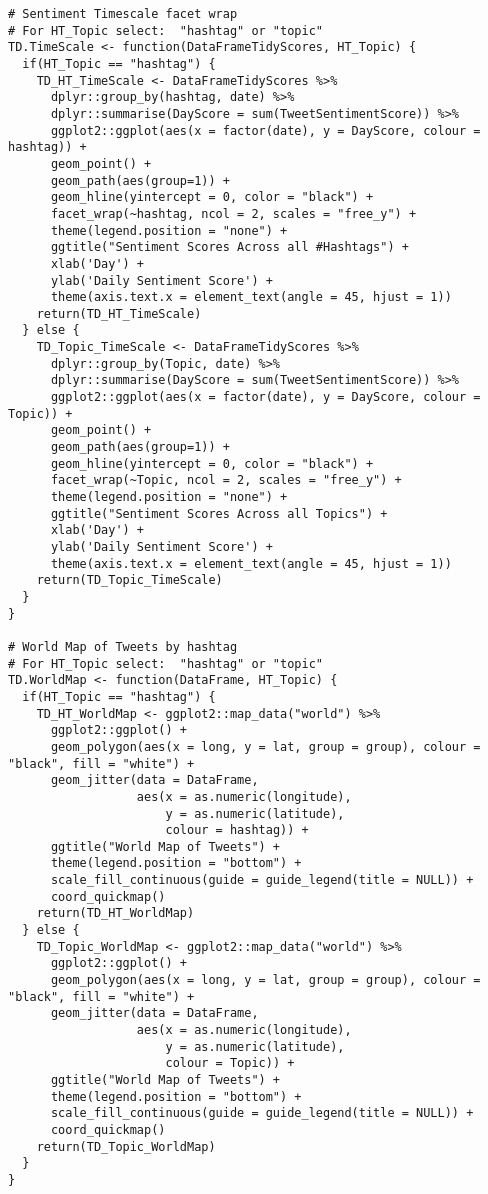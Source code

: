 \begin{lstlisting}
# Sentiment Timescale facet wrap
# For HT_Topic select:  "hashtag" or "topic"
TD.TimeScale <- function(DataFrameTidyScores, HT_Topic) {
  if(HT_Topic == "hashtag") {
    TD_HT_TimeScale <- DataFrameTidyScores %>% 
      dplyr::group_by(hashtag, date) %>% 
      dplyr::summarise(DayScore = sum(TweetSentimentScore)) %>% 
      ggplot2::ggplot(aes(x = factor(date), y = DayScore, colour = hashtag)) + 
      geom_point() +
      geom_path(aes(group=1)) +
      geom_hline(yintercept = 0, color = "black") +
      facet_wrap(~hashtag, ncol = 2, scales = "free_y") +
      theme(legend.position = "none") +
      ggtitle("Sentiment Scores Across all #Hashtags") +
      xlab('Day') +
      ylab('Daily Sentiment Score') +
      theme(axis.text.x = element_text(angle = 45, hjust = 1))
    return(TD_HT_TimeScale)
  } else {
    TD_Topic_TimeScale <- DataFrameTidyScores %>% 
      dplyr::group_by(Topic, date) %>% 
      dplyr::summarise(DayScore = sum(TweetSentimentScore)) %>% 
      ggplot2::ggplot(aes(x = factor(date), y = DayScore, colour = Topic)) + 
      geom_point() +
      geom_path(aes(group=1)) +
      geom_hline(yintercept = 0, color = "black") +
      facet_wrap(~Topic, ncol = 2, scales = "free_y") +
      theme(legend.position = "none") +
      ggtitle("Sentiment Scores Across all Topics") +
      xlab('Day') +
      ylab('Daily Sentiment Score') +
      theme(axis.text.x = element_text(angle = 45, hjust = 1))
    return(TD_Topic_TimeScale)
  }
}

# World Map of Tweets by hashtag
# For HT_Topic select:  "hashtag" or "topic"
TD.WorldMap <- function(DataFrame, HT_Topic) {
  if(HT_Topic == "hashtag") {
    TD_HT_WorldMap <- ggplot2::map_data("world") %>% 
      ggplot2::ggplot() + 
      geom_polygon(aes(x = long, y = lat, group = group), colour = "black", fill = "white") +
      geom_jitter(data = DataFrame,
                  aes(x = as.numeric(longitude),
                      y = as.numeric(latitude),
                      colour = hashtag)) + 
      ggtitle("World Map of Tweets") +
      theme(legend.position = "bottom") +
      scale_fill_continuous(guide = guide_legend(title = NULL)) +
      coord_quickmap()
    return(TD_HT_WorldMap)
  } else {
    TD_Topic_WorldMap <- ggplot2::map_data("world") %>% 
      ggplot2::ggplot() + 
      geom_polygon(aes(x = long, y = lat, group = group), colour = "black", fill = "white") +
      geom_jitter(data = DataFrame,
                  aes(x = as.numeric(longitude),
                      y = as.numeric(latitude),
                      colour = Topic)) + 
      ggtitle("World Map of Tweets") +
      theme(legend.position = "bottom") +
      scale_fill_continuous(guide = guide_legend(title = NULL)) +
      coord_quickmap()
    return(TD_Topic_WorldMap)
  }
}

\end{lstlisting}
